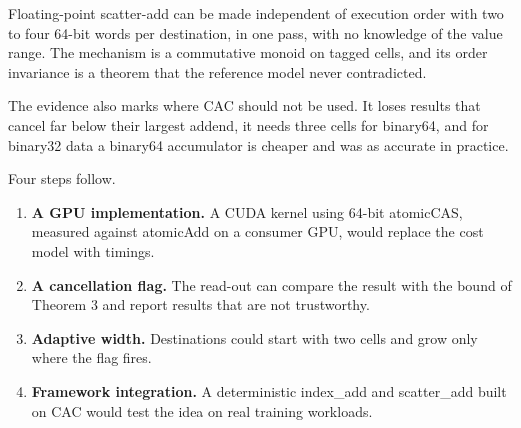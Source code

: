 \documentclass[3p,10pt]{elsarticle}
\begin{document}
Floating-point scatter-add can be made independent of execution order
with two to four 64-bit words per destination, in one pass, with no
knowledge of the value range. The mechanism is a commutative monoid on
tagged cells, and its order invariance is a theorem that the reference
model never contradicted.

The evidence also marks where CAC should not be used. It loses results
that cancel far below their largest addend, it needs three cells for
binary64, and for binary32 data a binary64 accumulator is cheaper and
was as accurate in practice.

Four steps follow.

\begin{enumerate}
\def\labelenumi{\arabic{enumi}.}
\item
  \textbf{A GPU implementation.} A CUDA kernel using 64-bit atomicCAS,
  measured against atomicAdd on a consumer GPU, would replace the cost
  model with timings.
\item
  \textbf{A cancellation flag.} The read-out can compare the result with
  the bound of Theorem 3 and report results that are not trustworthy.
\item
  \textbf{Adaptive width.} Destinations could start with two cells and
  grow only where the flag fires.
\item
  \textbf{Framework integration.} A deterministic index\_add and
  scatter\_add built on CAC would test the idea on real training
  workloads.
\end{enumerate}
\end{document}

